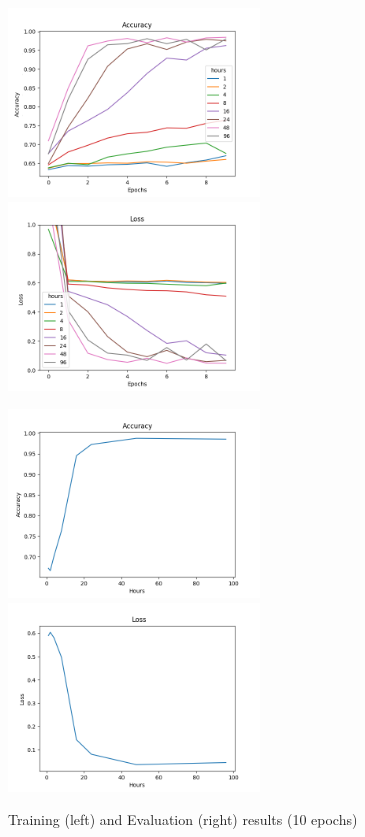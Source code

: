 \begin{figure}
      \begin{multicols}{2}
            \includegraphics[height=5cm]{img/control_condition/plot_acc_train.png}
            \includegraphics[height=5cm]{img/control_condition/plot_loss_train.png}

            \includegraphics[height=5cm]{img/control_condition/plot_acc_eval.png}
            \includegraphics[height=5cm]{img/control_condition/plot_loss_eval.png}
      \end{multicols}
      \caption{Training (left) and Evaluation (right) results (10 epochs)}
      \label{figure:control_condition_10e}
\end{figure}

